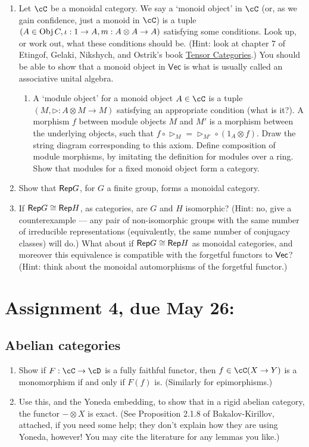 \documentclass[12pt]{amsart}
\begin{document}
\begin{enumerate}
\item Let $\cC$ be a monoidal category. We say a `monoid object' in $\cC$ (or, as we gain confidence, just a monoid in $\cC$) is a tuple $(A \in \Obj C, \iota: 1 \to A, m: A \otimes A \to A)$ satisfying some conditions. Look up, or work out, what these conditions should be. (Hint: look at chapter 7 of Etingof, Gelaki, Nikshych, and Ostrik's book \href{http://www-math.mit.edu/~etingof/egnobookfinal.pdf}{Tensor Categories}.) You should be able to show that a monoid object in $\mathsf{Vec}$ is what is usually called an associative unital algebra.
\begin{enumerate}
\item A `module object' for a monoid object $A \in \cC$ is a tuple $(M, \triangleright: A \otimes M \to M)$ satisfying an appropriate condition (what is it?). A morphism $f$ between module objects $M$ and $M'$ is a morphism between the underlying objects, such that $f \circ \triangleright_M = \triangleright_{M'} \circ (1_A \otimes f)$. Draw the string diagram corresponding to this axiom. Define composition of module morphisms, by imitating the definition for modules over a ring. Show that modules for a fixed monoid object form a category.
\end{enumerate}
\item Show that $\Rep G$, for $G$ a finite group, forms a monoidal category.
\item If $\Rep G \cong \Rep H$, as categories, are $G$ and $H$ isomorphic? (Hint: no, give a counterexample --- any pair of non-isomorphic groups with the same number of irreducible representations (equivalently, the same number of conjugacy classes) will do.) What about if $\Rep G \cong \Rep H$ as monoidal categories, and moreover this equivalence is compatible with the forgetful functors to $\Vec$? (Hint: think about the monoidal automorphisms of the forgetful functor.) %
\end{enumerate}

\newpage
\section{Assignment 4, due May 26:}
\subsection{Abelian categories}
\begin{enumerate}
\item Show if $F:\cC\to\cD$ is a fully faithful functor, then $f \in \cC(X \to Y)$ is a monomorphism if and only if $F(f)$ is. (Similarly for epimorphisms.)
\item Use this, and the Yoneda embedding, to show that in a rigid abelian category, the functor $- \otimes X$ is exact. (See Proposition 2.1.8 of Bakalov-Kirillov, attached, if you need some help; they don't explain how they are using Yoneda, however! You may cite the literature for any lemmas you like.)
\end{enumerate}
\end{document}
